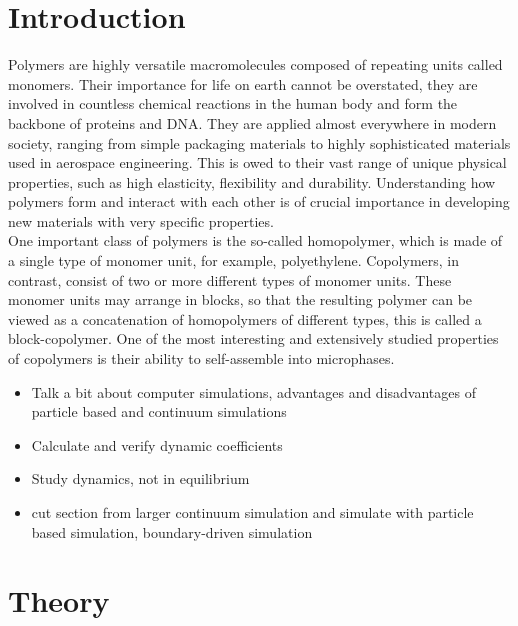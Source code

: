 \documentclass[bachelor,       %
               twoside,        %
               BCOR10mm,       %
                ngerman,english  %
               ]{GAUBM}
\begin{document}
\mainmatter   %

\chapter{Introduction}

Polymers are highly versatile macromolecules composed of repeating units called monomers. Their importance for life on earth cannot be overstated, they are involved in countless chemical reactions in the human body and form the backbone of proteins and DNA. They are applied almost everywhere in modern society, ranging from simple packaging materials to highly sophisticated materials used in aerospace engineering. This is owed to their vast range of unique physical properties, such as high elasticity, flexibility and durability. Understanding how polymers form and interact with each other is of crucial importance in developing new materials with very specific properties.\\
One important class of polymers is the so-called homopolymer, which is made of a single type of monomer unit, for example, polyethylene. Copolymers, in contrast, consist of two or more different types of monomer units. These monomer units may arrange in blocks, so that the resulting polymer can be viewed as a concatenation of homopolymers of different types, this is called a block-copolymer. One of the most interesting and extensively studied properties of copolymers is their ability to self-assemble into microphases. 


\begin{itemize}
  \item Talk a bit about computer simulations, advantages and disadvantages of particle based and continuum simulations
  \item Calculate and verify dynamic coefficients
  \item Study dynamics, not in equilibrium
  \item cut section from larger continuum simulation and simulate with particle based simulation, boundary-driven simulation
 

\end{itemize}

\chapter{Theory}
\end{document}
